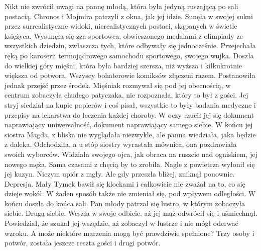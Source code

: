 Nikt nie zwrócił uwagi na pannę młodą, która była jedyną ruszającą po sali postacią. Chronos i Mojmira patrzyli z okna, jak jej idzie.
Sunęła w swojej sukni przez surrealistyczne widoki, nierealistycznych postaci, skąpanych w świetle księżyca.
Wysunęła się zza sportowca, obwieszonego medalami z olimpiady ze wszystkich dziedzin, zwłaszcza tych, które odbywały się jednocześnie.
Przejechała ręką po karoserii termojądrowego samochodu sportowego, swojego wujka.
Doszła do wielkiej góry mięśni, która była bardziej szersza, niż wyższa i kilkukrotnie większa od potwora. Wszyscy bohaterowie komiksów złączeni razem.
Postanowiła jednak przejść przez środek. Mięśniak rozmywał się pod jej obecnością, w centrum zobaczyła chudego patyczaka, nie rozpoznała, który to był z gości.
Jej stryj siedział na kupie papierów i coś pisał, wszystkie to były badania medyczne i przepisy na lekarstwa do leczenia każdej choroby.
W oczy rzucił jej się dokument naprawiający uniwersalność, dokument naprawiający samego siebie.
W końcu jej siostra Magda, z bliska nie wyglądała niezwykle, ale panna wiedziała, jaka będzie z daleka. 
Odchodziła, a u stóp siostry wyrastała mównica, ona pozdrawiała swoich wyborców.
Widziała swojego ojca, jak obraca na ruszcie nad ogniskiem, jej nowego męża. Sama czasami z chęcią by to zrobiła.
Nagle z powietrza wyłonił się jej kuzyn. Niczym upiór z mgły.
Ale gdy przeszła bliżej, zniknął ponownie. Depresja.
Mały Tymek bawił się klockami i całkowicie nie zważał na to, co się dzieje wokół. W żaden sposób także nie zmieniał się, pod wpływem odległości.
W końcu doszła do końca sali. Pan młody patrzał się lustro, w którym zobaczyła siebie. Drugą siebie.
Weszła w swoje odbicie, aż jej mąż odwrócił się i uśmiechnął. Powiedział, że szukał jej wszędzie, aż zobaczył w lustrze i nie mógł oderwać wzroku.
A może niektóre marzenia mogą być prawdziwie spełnione?
Trzy osoby i potwór, została jeszcze reszta gości i drugi potwór.

